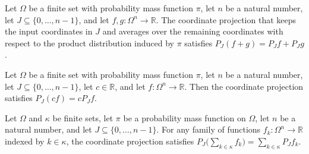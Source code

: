 \begin{theorem}
\label{FABL.projectOnCoordinates_add}
\leanok
{}
Let $\Omega$ be a finite set with probability mass function $\pi$, let $n$ be a natural
number, let $J\subseteq\{0,\ldots,n-1\}$, and let $f,g:\Omega^n\to\mathbb{R}$. The
coordinate projection that keeps the input coordinates in $J$ and averages over the
remaining coordinates with respect to the product distribution induced by $\pi$
satisfies $P_J(f+g)=P_Jf+P_Jg$.
\end{theorem}

\begin{theorem}
\label{FABL.projectOnCoordinates_smul}
\leanok
{}
Let $\Omega$ be a finite set with probability mass function $\pi$, let $n$ be a natural
number, let $J\subseteq\{0,\ldots,n-1\}$, let $c\in\mathbb{R}$, and let
$f:\Omega^n\to\mathbb{R}$. Then the coordinate projection satisfies $P_J(cf)=cP_Jf$.
\end{theorem}

\begin{theorem}
\label{FABL.projectOnCoordinates_sum}
\leanok
{}
Let $\Omega$ and $\kappa$ be finite sets, let $\pi$ be a probability mass function on
$\Omega$, let $n$ be a natural number, and let $J\subseteq\{0,\ldots,n-1\}$. For any
family of functions $f_k:\Omega^n\to\mathbb{R}$ indexed by $k\in\kappa$, the coordinate
projection satisfies $P_J\bigl(\sum_{k\in\kappa}f_k\bigr)=\sum_{k\in\kappa}P_Jf_k$.
\end{theorem}

